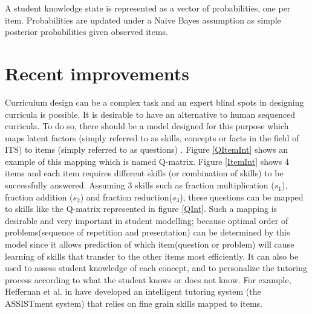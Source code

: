 A student knowledge state is represented as a vector of probabilities, one per item.  Probabilities are updated under a Naive Bayes assumption as simple posterior probabilities given observed items.





\section{Recent improvements}


Curriculum design can be a complex task and an expert blind spots in designing curricula is possible. It is desirable to have an alternative to human sequenced curricula. To do so, there should be a model designed for this purpose which maps latent factors (simply referred to as skills, concepts or facts in the field of ITS) to items (simply referred to as questions) \citep{Tatsuoka1983,Tatsuoka2009}. Figure \ref{QItemInt} shows an example of this mapping which is named  Q-matrix.  Figure \ref{ItemInt} shows 4 items and each item requires different skills (or combination of skills) to be successfully answered. Assuming 3 skills such as fraction multiplication ($s_{1}$), fraction addition ($s_{2}$) and fraction reduction($s_{3}$), these questions can be mapped to skills like the Q-matrix represented in figure \protect\ref{QInt}. Such a mapping is desirable and very important in student modelling; because optimal order of problems(sequence of repetition and presentation) can be determined by this model since it allows prediction of which item(question or problem) will cause learning of skills that transfer to the other items most efficiently. It can also be used to assess student knowledge of each concept, and to personalize the tutoring process according to what the student knows or does not know.  For example, Heffernan et al. in \citep{feng2009using} have developed an intelligent tutoring system (the ASSISTment system) that relies on fine grain skills mapped to items.


